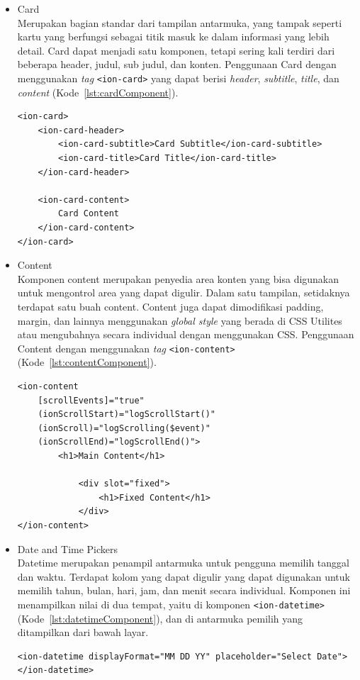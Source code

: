 \begin{itemize}
	\item Card \\
	Merupakan bagian standar dari tampilan antarmuka, yang tampak seperti kartu yang berfungsi sebagai titik masuk ke dalam informasi yang lebih detail. Card dapat menjadi satu komponen, tetapi sering kali terdiri dari beberapa header, judul, sub judul, dan konten. Penggunaan Card dengan menggunakan {\it tag} \texttt{<ion-card>} yang dapat berisi {\it header}, {\it subtitle}, {\it title}, dan {\it content} (Kode~\ref{lst:cardComponent}).

\begin{lstlisting}[label={lst:cardComponent}, caption=Potongan Kode Program dari Card Component]
<ion-card>
	<ion-card-header>
		<ion-card-subtitle>Card Subtitle</ion-card-subtitle>
		<ion-card-title>Card Title</ion-card-title>
	</ion-card-header>
				
	<ion-card-content>
		Card Content
	</ion-card-content>
</ion-card>
\end{lstlisting} 
	
	\item Content\\
	Komponen content merupakan penyedia area konten yang bisa digunakan untuk mengontrol area yang dapat digulir. Dalam satu tampilan, setidaknya terdapat satu buah content. Content juga dapat dimodifikasi padding, margin, dan lainnya menggunakan {\it global style} yang berada di CSS Utilites atau mengubahnya secara individual dengan menggunakan CSS. Penggunaan Content dengan menggunakan {\it tag} \texttt{<ion-content>} (Kode~\ref{lst:contentComponent}).

\begin{lstlisting}[label={lst:contentComponent}, caption=Potongan Kode Program dari Content Component]
<ion-content
	[scrollEvents]="true"
	(ionScrollStart)="logScrollStart()"
	(ionScroll)="logScrolling($event)"
	(ionScrollEnd)="logScrollEnd()">
		<h1>Main Content</h1>
			
			<div slot="fixed">
				<h1>Fixed Content</h1>
			</div>
</ion-content>
\end{lstlisting} 

	\item Date and Time Pickers\\
	Datetime merupakan penampil antarmuka untuk pengguna memilih tanggal dan waktu. Terdapat kolom yang dapat digulir yang dapat digunakan untuk memilih tahun, bulan, hari, jam, dan menit secara individual. Komponen ini menampilkan nilai di dua tempat, yaitu di komponen \texttt{<ion-datetime>} (Kode~\ref{lst:datetimeComponent}), dan di antarmuka pemilih yang ditampilkan dari bawah layar.
\begin{lstlisting}[label={lst:datetimeComponent}, caption=Kode Program dari Datetime Component dengan Format Bulan-Hari-Tahun]
<ion-datetime displayFormat="MM DD YY" placeholder="Select Date"></ion-datetime>
\end{lstlisting} 


\end{itemize}
